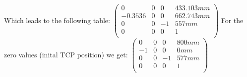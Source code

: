 \begin{comment}
$
{\tiny
\begin{pmatrix}
c(\pi /4)c(-\pi /3)c(\pi /2) & 0 & 0 & c(\pi /4)c(-\pi /3)375mm+c(\pi /4)425mm \\
s(\pi /4)c(-\pi /3)c(\pi /2) -c(\pi /4)s(-\pi /3)c(\pi /2)-c(\pi /4)c(-\pi /3)s(\pi /2) & -c(\pi /4)c(-\pi /3)c(\pi /2) & 0 & s(\pi /4)c(-\pi /3)375mm-c(\pi /4)s(-\pi /3)375mm+s(\pi /4)425mm \\
0 & 0 & -1 & 677mm-120mm \\
0 & 0 & 0 & 1 \\
\end{pmatrix}\\
}$
\end{comment}
Which leads to the following table:
$\begin{pmatrix}
0 & 0 & 0 & 433.103mm \\
-0.3536 & 0 & 0 & 662.743mm \\
0 & 0 & -1 & 557mm\\
0 & 0 & 0 & 1\\
\end{pmatrix}$
For the zero values (inital TCP position) we get:
$\begin{pmatrix}
0 & 0 & 0 & 800mm \\
-1 & 0 & 0 & 0mm \\
0 & 0 & -1 & 577mm\\
0 & 0 & 0 & 1\\
\end{pmatrix}$
\begin{comment}
$=
\begin{pmatrix}
90\degree & 90\degree & 90\degree & 433.103mm \\
110.7048\degree & 90\degree & 90\degree & 662.743mm\\
90\degree & 90\degree & 180\degree & 557mm\\
0 & 0 & 0 & 1\\
\end{pmatrix}$
\end{comment}
\\
